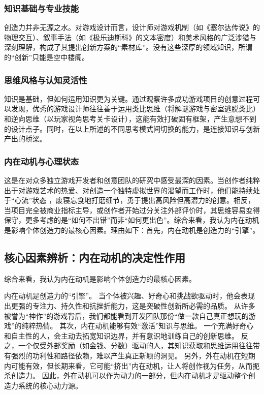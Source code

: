 \documentclass[supercite]{HustGSClassPaper}
\begin{document}
	\subsubsection{知识基础与专业技能}
	创造力并非无源之水。对游戏设计而言，设计师对游戏机制（如《塞尔达传说》的物理交互）、叙事手法（如《极乐迪斯科》的文本密度）和美术风格的广泛涉猎与深刻理解，构成了其提出创新方案的“素材库”。没有这些深厚的领域知识，所谓的“创新”只能是空中楼阁。
	\subsubsection{思维风格与认知灵活性}
	知识是基础，但如何运用知识更为关键。通过观察许多成功游戏项目的创意过程可以发现，优秀的游戏设计师往往善于运用类比思维（将解谜游戏与密室逃脱类比）和逆向思维（以玩家视角思考关卡设计），这能有效打破固有框架，产生意想不到的设计点子。同时，在以上所述的不同思考模式间切换的能力，是连接知识与创新产出的桥梁。
	\subsubsection{内在动机与心理状态}
	这是在对众多独立游戏开发者和创意团队的研究中感受最深的因素。当创作者纯粹出于对游戏艺术的热爱、对创造一个独特虚拟世界的渴望而工作时，他们能持续处于“心流”状态 \cite{csikszentmihalyi1996creativity}，废寝忘食地打磨细节，勇于提出高风险但高潜力的创意。相反，当项目完全被商业指标主导，或创作者开始过分关注外部评价时，其思维容易变得保守，更多考虑的是“如何不出错”而非“如何更出色”。综合来看，我认为内在动机是影响个体创造力的最核心因素。理由如下：首先，内在动机是创造力的“引擎”。
	\subsection{核心因素辨析：内在动机的决定性作用}
	综合来看，我认为内在动机是影响个体创造力的最核心因素。

	内在动机是创造力的“引擎”。
	当个体被兴趣、好奇心和挑战欲驱动时，他会表现出更强的专注力、持久性和抗挫折能力，这是突破性创新所必需的品质。
	从许多被誉为“神作”的游戏背后，我们都能看到开发团队那份“做一款自己真正想玩的游戏”的纯粹热情。
	其次，内在动机能够有效“激活”知识与思维。
	一个充满好奇心和自主性的人，会主动去拓宽知识边界，并有意识地训练自己的创新思维。
	反之，一个仅受外部奖励（如金钱、分数）驱动的人，其知识获取和思维运用往往带有强烈的功利性和路径依赖，难以产生真正新颖的洞见。
	另外，外在动机在短期内可能有效，但长期来看，它可能“挤出”内在动机，让人将创作视为任务，从而扼杀创造力。
	因此，外在动机可以作为动力的一部分，但内在动机才是驱动整个创造力系统的核心动力源。
\end{document}
